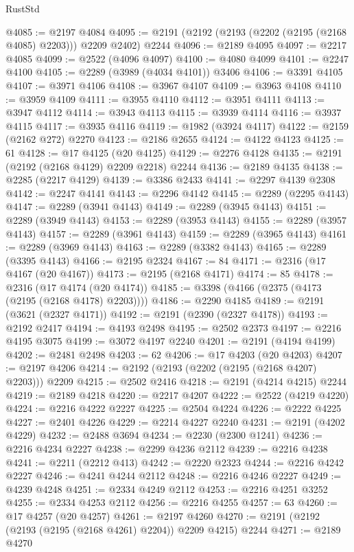 \begin{lexlean}{RustStd}
\begin{coremodule}
@4085 := @2197 @4084
@4095 := @2191 (@2192 (@2193 (@2202 (@2195 (@2168 @4085) @2203))) @2209 @2402) @2244
@4096 := @2189 @4095
@4097 := @2217 @4085
@4099 := @2522 (@4096 @4097)
@4100 := @4080 @4099
@4101 := @2247 @4100
@4105 := @2289 (@3989 (@4034 @4101)) @3406
@4106 := @3391 @4105
@4107 := @3971 @4106
@4108 := @3967 @4107
@4109 := @3963 @4108
@4110 := @3959 @4109
@4111 := @3955 @4110
@4112 := @3951 @4111
@4113 := @3947 @4112
@4114 := @3943 @4113
@4115 := @3939 @4114
@4116 := @3937 @4115
@4117 := @3935 @4116
@4119 := @1982 (@3924 @4117)
@4122 := @2159 (@2162 @272) @2270
@4123 := @2186 @2655
@4124 := @4122 @4123
@4125 := 61
@4128 := @17 @4125 (@20 @4125)
@4129 := @2276 @4128
@4135 := @2191 (@2192 (@2168 @4129) @2209 @2218) @2244
@4136 := @2189 @4135
@4138 := @2285 (@2217 @4129)
@4139 := @3386 @2433
@4141 := @2297 @4139 @2308
@4142 := @2247 @4141
@4143 := @2296 @4142
@4145 := @2289 (@2295 @4143)
@4147 := @2289 (@3941 @4143)
@4149 := @2289 (@3945 @4143)
@4151 := @2289 (@3949 @4143)
@4153 := @2289 (@3953 @4143)
@4155 := @2289 (@3957 @4143)
@4157 := @2289 (@3961 @4143)
@4159 := @2289 (@3965 @4143)
@4161 := @2289 (@3969 @4143)
@4163 := @2289 (@3382 @4143)
@4165 := @2289 (@3395 @4143)
@4166 := @2195 @2324
@4167 := 84
@4171 := @2316 (@17 @4167 (@20 @4167))
@4173 := @2195 (@2168 @4171)
@4174 := 85
@4178 := @2316 (@17 @4174 (@20 @4174))
@4185 := @3398 (@4166 (@2375 (@4173 (@2195 (@2168 @4178) @2203))))
@4186 := @2290 @4185
@4189 := @2191 (@3621 (@2327 @4171))
@4192 := @2191 (@2390 (@2327 @4178))
@4193 := @2192 @2417
@4194 := @4193 @2498
@4195 := @2502 @2373
@4197 := @2216 @4195 @3075
@4199 := @3072 @4197 @2240
@4201 := @2191 (@4194 @4199)
@4202 := @2481 @2498
@4203 := 62
@4206 := @17 @4203 (@20 @4203)
@4207 := @2197 @4206
@4214 := @2192 (@2193 (@2202 (@2195 (@2168 @4207) @2203))) @2209
@4215 := @2502 @2416
@4218 := @2191 (@4214 @4215) @2244
@4219 := @2189 @4218
@4220 := @2217 @4207
@4222 := @2522 (@4219 @4220)
@4224 := @2216 @4222 @2227
@4225 := @2504 @4224
@4226 := @2222 @4225
@4227 := @2401 @4226
@4229 := @2214 @4227 @2240
@4231 := @2191 (@4202 @4229)
@4232 := @2488 @3694
@4234 := @2230 (@2300 @1241)
@4236 := @2216 @4234 @2227
@4238 := @2299 @4236 @2112
@4239 := @2216 @4238
@4241 := @2211 (@2212 @413)
@4242 := @2220 @2323
@4244 := @2216 @4242 @2227
@4246 := @4241 @4244 @2112
@4248 := @2216 @4246 @2227
@4249 := @4239 @4248
@4251 := @2334 @4249 @2112
@4253 := @2216 @4251 @3252
@4255 := @2334 @4253 @2112
@4256 := @2216 @4255
@4257 := 63
@4260 := @17 @4257 (@20 @4257)
@4261 := @2197 @4260
@4270 := @2191 (@2192 (@2193 (@2195 (@2168 @4261) @2204)) @2209 @4215) @2244
@4271 := @2189 @4270

\end{coremodule}
\end{lexlean}
